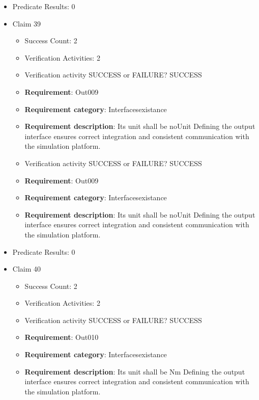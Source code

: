 \documentclass{article}
\begin{document}
\begin{itemize}
\begin{itemize}
				\end{itemize}
				
									    
				\item Predicate Results: 0

  				  \item Claim 39
				\begin{itemize}
			    	\item Success Count: 2 
			    	\item Verification Activities: 2
					\item Verification activity SUCCESS or FAILURE? SUCCESS
		
						\item \textbf{Requirement}: Out009 
						\item \textbf{Requirement category}: Interfacesexistance 
						\item \textbf{Requirement description}: Its unit shall be noUnit Defining the output interface ensures correct integration and consistent communication with the simulation platform.
					
					\item Verification activity SUCCESS or FAILURE? SUCCESS
		
						\item \textbf{Requirement}: Out009 
						\item \textbf{Requirement category}: Interfacesexistance 
						\item \textbf{Requirement description}: Its unit shall be noUnit Defining the output interface ensures correct integration and consistent communication with the simulation platform.
					
				\end{itemize}
				
									    
				\item Predicate Results: 0

  				  \item Claim 40
				\begin{itemize}
			    	\item Success Count: 2 
			    	\item Verification Activities: 2
					\item Verification activity SUCCESS or FAILURE? SUCCESS
		
						\item \textbf{Requirement}: Out010 
						\item \textbf{Requirement category}: Interfacesexistance 
						\item \textbf{Requirement description}: Its unit shall be Nm Defining the output interface ensures correct integration and consistent communication with the simulation platform.
					

\end{itemize}
\end{itemize}
\end{document}
